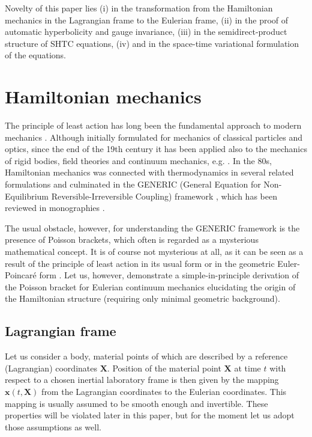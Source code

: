 \documentclass[
10pt, %
a4paper, %
oneside, %
headinclude,footinclude, %
BCOR5mm, %
]{scrartcl}
\newcommand{\xx}{\mathbf{x}}
\newcommand{\XX}{\mathbf{X}}
\begin{document}
Novelty of this paper lies (i) in the transformation from the Hamiltonian 
mechanics in the Lagrangian frame to the Eulerian frame, (ii) in the proof of 
automatic hyperbolicity and gauge invariance, (iii) in the semidirect-product 
structure of SHTC equations, (iv) and in the space-time variational formulation 
of the equations.



\section{Hamiltonian mechanics}\label{sec.Ham}
The principle of least action has long been the fundamental approach to modern mechanics 
\cite{Landau1}. Although initially formulated for mechanics of classical particles and optics, 
since the end of the 19th century it has been applied also to the mechanics of rigid bodies, field 
theories 
and continuum mechanics, e.g. \cite{Arnold}. In the 80s, Hamiltonian mechanics was connected 
with thermodynamics in several related formulations \cite{dv,Morrison-brackets, g1, 
EdwardsBeris91,BE} and culminated in the GENERIC (General Equation for Non-Equilibrium 
Reversible-Irreversible Coupling) framework \cite{Grmela1997,Ottinger1997}, which has been reviewed 
in monographies \cite{BE,HCO,PKG}.

The usual obstacle, however, for understanding the GENERIC framework is the presence of Poisson brackets, which often is regarded as a mysterious mathematical concept. It is of course not mysterious at all, as it can be seen as a result of the principle of least action in its usual form or in the geometric Euler-Poincaré form \cite{Holm2002}. Let us, however, demonstrate a simple-in-principle derivation of the Poisson bracket for Eulerian continuum mechanics elucidating the origin of the Hamiltonian structure (requiring only minimal geometric background).

\subsection{Lagrangian frame}\label{sec.Lagrange}
Let us consider a body, material points of which are described by a reference (Lagrangian) 
coordinates $\XX$. Position of the material point $\XX$ at time $t$ with respect to a chosen 
inertial laboratory frame is then given by the mapping $\xx(t,\XX)$ from the Lagrangian coordinates 
to the Eulerian coordinates. This mapping is usually assumed to be smooth enough and invertible. 
These properties will be violated later in this paper, but for the moment let us adopt those 
assumptions as well. 
\end{document}
